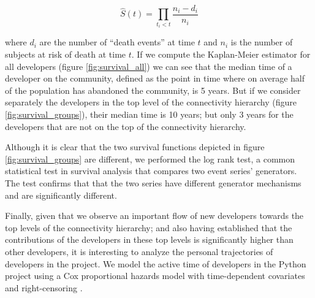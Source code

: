 $$
\hat{S}(t) = \prod_{t_i < t} \frac{n_i - d_i}{n_i}
$$

where $d_i$ are the number of ``death events'' at time $t$ and $n_i$ is the number of subjects at risk of death at time $t$. If we compute the Kaplan-Meier estimator for all developers (figure \ref{fig:survival_all}) we can see that the median time of a developer on the community, defined as the point in time where on average half of the population has abandoned the community, is 5 years. But if we consider separately the developers in the top level of the connectivity hierarchy (figure \ref{fig:survival_groups}), their median time is 10 years; but only 3 years for the developers that are not on the top of the connectivity hierarchy.

Although it is clear that the two survival functions depicted in figure \ref{fig:survival_groups} are different, we performed the log rank test, a common statistical test in survival analysis that compares two event series' generators. The test confirms that that the two series have different generator mechanisms and are significantly different.

Finally, given that we observe an important flow of new developers towards the top levels of the connectivity hierarchy; and also having established that the contributions of the developers in these top levels is significantly higher than other developers, it is interesting to analyze the personal trajectories of developers in the project. We model the active time of developers in the Python project using a Cox proportional hazards model with time-dependent covariates and right-censoring \citep[appendix on survival analysis]{fox:2002}.


